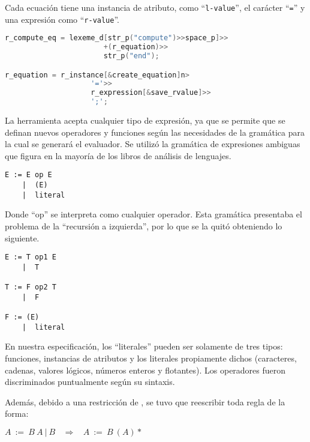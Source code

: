 Cada ecuación tiene una instancia de atributo, como ``\texttt{l-value}'', el carácter ``\texttt{=}'' y una expresión como ``\texttt{r-value}''.

\begin{lstlisting}[language=C++, basicstyle=\scriptsize, columns=fullflexible, linewidth=9cm]
r_compute_eq = lexeme_d[str_p("compute")>>space_p]>>
                       +(r_equation)>>
                       str_p("end");

r_equation = r_instance[&create_equation]n>
                    '='>>
                    r_expression[&save_rvalue]>>
                    ';';
\end{lstlisting}

La herramienta acepta cualquier tipo de expresión, ya que se permite que se definan nuevos operadores y funciones según las necesidades de la gramática para la cual se generará el evaluador. Se utilizó la gramática de expresiones ambiguas que figura en la mayoría de los libros de análisis de lenguajes.

\begin{lstlisting}[backgroundcolor=\color{white}, columns=fullflexible, linewidth=7cm]
E := E op E
    |  (E)
    |  literal
\end{lstlisting}

Donde ``op'' se interpreta como cualquier operador. Esta gramática presentaba el problema de la ``recursión a izquierda'', por lo que se la quitó obteniendo lo siguiente.

\begin{lstlisting}[backgroundcolor=\color{white}, columns=fullflexible, linewidth=7cm]
E := T op1 E
    |  T

T := F op2 T
    |  F

F := (E)
    |  literal
\end{lstlisting}

En nuestra especificación, los ``literales'' pueden ser solamente de tres tipos: funciones, instancias de atributos y los literales propiamente dichos (caracteres, cadenas, valores lógicos, números enteros y flotantes). Los operadores fueron discriminados puntualmente según su sintaxis.

Además, debido a una restricción de \spirit, se tuvo que reescribir toda regla de la forma:

\begin{center}\textbf{\large{$A\ :=\ B\ A\ |\ B\ \ \ \ \Rightarrow\ \ \ \ A\ :=\ B\ (A)*$}}\end{center}

